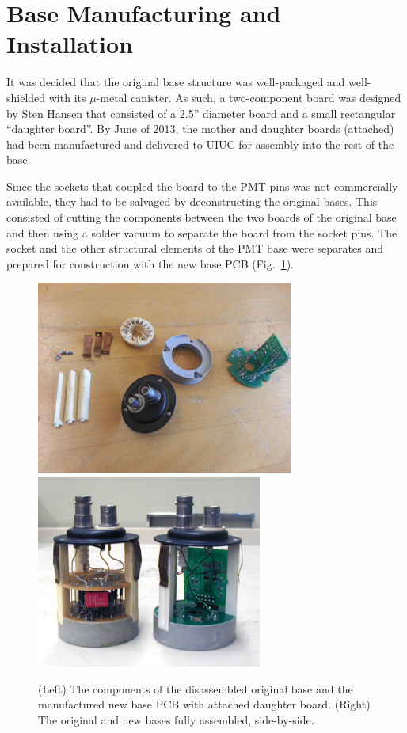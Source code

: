 \section{Base Manufacturing and Installation}

It was decided that the original base structure was well-packaged and well-shielded with its $\mu$-metal canister. As such, a two-component board was designed by Sten Hansen that consisted of a 2.5'' diameter board and a small rectangular ``daughter board''. By June of 2013, the mother and daughter boards (attached) had been manufactured and delivered to UIUC for assembly into the rest of the base.

Since the sockets that coupled the board to the PMT pins was not commercially available, they had to be salvaged by deconstructing the original bases. This consisted of cutting the components between the two boards of the original base and then using a solder vacuum to separate the board from the socket pins. The socket and the other structural elements of the PMT base were separates and prepared for construction with the new base PCB (Fig.~\ref{fig:old-new-base}).

\begin{figure}[h]
	\centerline{
		\mbox{\includegraphics[height=2.5in]{figures/disassembled-base.jpg} \includegraphics[height=2.5in]{figures/old-new-base.png}}}
	\caption{(Left) The components of the disassembled original base and the manufactured new base PCB with attached daughter board. (Right) The original and new bases fully assembled, side-by-side.}
	\label{fig:old-new-base}
\end{figure}

